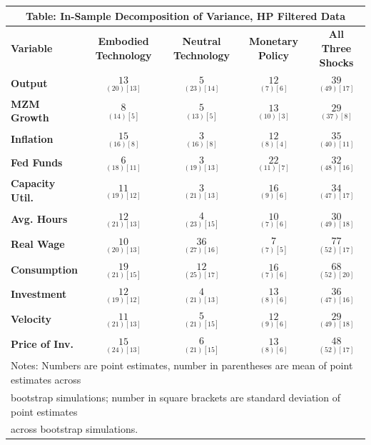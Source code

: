 \documentclass{article}
\begin{document}
 \begin{tabular}{|l|c|@{}c|c|@{}c|} 
 \hline 
 \multicolumn{5}{|c|}{\textbf{Table: In-Sample Decomposition of Variance, HP Filtered Data}} \\ \hline 
 \textbf{Variable} & \textbf{Embodied Technology} & \textbf{Neutral Technology} & \textbf{%
 Monetary Policy} & \textbf{All Three Shocks} \\ \hline\hline 
 \textbf{Output} & $\underset{( 20)[ 13]}{ 13}$ & $\underset{( 23)[ 14]}{  5}$ & $\underset{(  7)[  6]}{ 12}$ & $\underset{( 49)[ 17]}{ 39}$ \\ \hline 
 \textbf{MZM Growth} & $\underset{( 14)[  5]}{  8}$ & $\underset{( 13)[  5]}{  5}$ & $\underset{( 10)[  3]}{ 13}$ & $\underset{( 37)[  8]}{ 29}$ \\ \hline 
 \textbf{Inflation} & $\underset{( 16)[  8]}{ 15}$ & $\underset{( 16)[  8]}{  3}$ & $\underset{(  8)[  4]}{ 12}$ & $\underset{( 40)[ 11]}{ 35}$ \\ \hline 
 \textbf{Fed Funds} & $\underset{( 18)[ 11]}{  6}$ & $\underset{( 19)[ 13]}{  3}$ & $\underset{( 11)[  7]}{ 22}$ & $\underset{( 48)[ 16]}{ 32}$ \\ \hline 
 \textbf{Capacity Util.} & $\underset{( 19)[ 12]}{ 11}$ & $\underset{( 21)[ 13]}{  3}$ & $\underset{(  9)[  6]}{ 16}$ & $\underset{( 47)[ 17]}{ 34}$ \\ \hline 
 \textbf{Avg. Hours} & $\underset{( 21)[ 13]}{ 12}$ & $\underset{( 23)[ 15]}{  4}$ & $\underset{(  7)[  6]}{ 10}$ & $\underset{( 49)[ 18]}{ 30}$ \\ \hline 
 \textbf{Real Wage} & $\underset{( 20)[ 13]}{ 10}$ & $\underset{( 27)[ 16]}{ 36}$ & $\underset{(  7)[  5]}{  7}$ & $\underset{( 52)[ 17]}{ 77}$ \\ \hline 
 \textbf{Consumption} & $\underset{( 21)[ 15]}{ 19}$ & $\underset{( 25)[ 17]}{ 12}$ & $\underset{(  7)[  6]}{ 16}$ & $\underset{( 52)[ 20]}{ 68}$ \\ \hline 
 \textbf{Investment} & $\underset{( 19)[ 12]}{ 12}$ & $\underset{( 21)[ 13]}{  4}$ & $\underset{(  8)[  6]}{ 13}$ & $\underset{( 47)[ 16]}{ 36}$ \\ \hline 
 \textbf{Velocity} & $\underset{( 21)[ 13]}{ 11}$ & $\underset{( 21)[ 15]}{  5}$ & $\underset{(  9)[  6]}{ 12}$ & $\underset{( 49)[ 18]}{ 29}$ \\ \hline 
 \textbf{Price of Inv.} & $\underset{( 24)[ 13]}{ 15}$ & $\underset{( 21)[ 15]}{  6}  $ & $\underset{(  8)[  6]}{ 13}$ & $\underset{( 52)[ 17]}{ 48}$ \\ \hline 
 \multicolumn{5}{|l|}{Notes: Numbers are point estimates, number in 
 parentheses are mean of point estimates across} \\ \hline 
 \multicolumn{5}{|l|}{bootstrap simulations; number in square brackets are 
 standard deviation of point estimates} \\ \hline 
 \multicolumn{5}{|l|}{across bootstrap simulations.} \\ \hline 
 \end{tabular} 
\end{document}
